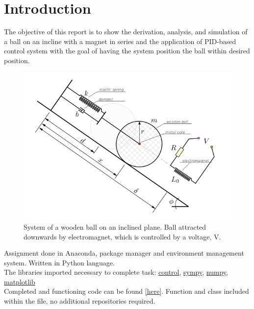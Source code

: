 
\section{Introduction}%
\label{Introduction}
The objective of this report is to show the derivation, analysis, and simulation of a ball on an incline with a magnet in series and the application of PID-based control system with the goal of having the system position the ball within desired position.

\begin{figure}[H]
	\centering
	\captionsetup{justification=centering}
	\includegraphics[width=0.8\linewidth]{imgs/problemFigure.png}
	\caption{System of a wooden ball on an inclined plane. Ball attracted downwards by electromagnet, which is controlled by a voltage, V.}%
	\label{fig:14}
\end{figure}


Assignment done in Anaconda, package manager and environment management system. Written in Python language.\\ The libraries imported necessary to complete task: \href{https://anaconda.org/conda-forge/control}{control}, \href{https://anaconda.org/anaconda/sympy}{sympy}, \href{https://anaconda.org/anaconda/numpy}{numpy}, \href{https://anaconda.org/conda-forge/matplotlib}{matplotlib} \\

Completed and functioning code can be found \href{https://github.com/ELE2024-Controls/Coursework}{[here]}. Function and class included within the file, no additional repositories required.
